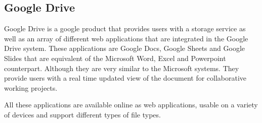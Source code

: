 \subsection{Google Drive}
Google Drive is a google product that provides users with a storage service as well as an array of different web applications that are integrated in the Google Drive system. These applications are Google Docs, Google Sheets and Google Slides that are equivalent of the Microsoft Word, Excel and Powerpoint counterpart. Although they are very similar to the Microsoft systems. They provide users with a real time updated view of the document for collaborative working projects.

All these applications are available online as web applications, usable on a variety of devices and support different types of file types.\cite{GoogleDriveContents}